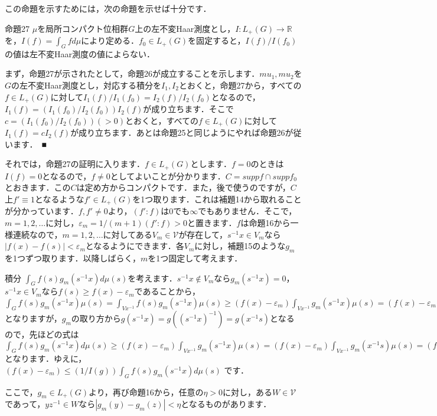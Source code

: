 この命題を示すためには，次の命題を示せば十分です．

命題27
$\mu$を局所コンパクト位相群$G$上の左不変Haar測度とし，$I \colon L_{+}(G) \to \mathbb{R}$を，$I(f)=\int_{G}f d\mu$により定める．$f_0 \in L_{+}(G)$を固定すると，$I(f)/I(f_0)$の値は左不変Haar測度の値によらない．

まず，命題27が示されたとして，命題26が成立することを示します．$mu_1, mu_2$を$G$の左不変Haar測度とし，対応する積分を$I_1, I_2$とおくと，命題27から，すべての$f \in L_{+}(G)$に対して$I_{1}(f)/I_{1}(f_0)=I_{2}(f)/I_{2}(f_0)$となるので，$I_{1}(f)= \left( I_{1}(f_0)/I_{2}(f_{0}) \right) I_{2}(f)$が成り立ちます．そこで$c=\left( I_{1}(f_0)/I_{2}(f_{0}) \right)(>0)$とおくと，すべての$f \in L_{+}(G)$に対して$I_{1}(f)= c I_{2}(f)$が成り立ちます．あとは命題25と同じようにやれば命題26が従います．　■

それでは，命題27の証明に入ります．$f \in L_{+}(G)$とします．$f=0$のときは$I(f)=0$となるので，$f \neq 0$としてよいことが分かります．$C=supp f \cap supp f_{0}$とおきます．この$C$は定め方からコンパクトです．また，後で使うのですが，$C$上$f' \equiv 1$となるような$f' \in L_{
+}(G)$を1つ取ります．これは補題14から取れることが分かっています．$f, f' \neq 0$より，$\left( f' \colon f\right)$は0でも$\infty$でもありません．そこで，$m=1,2,\ldots$に対し，$\varepsilon_{m}=1/(m+1)\left( f' \colon f \right)>0$と置きます．$f$は命題16から一様連続なので，$m=1,2,\ldots$に対してある$V_m \in \mathscr{V}$が存在して，$s^{-1}x \in V_m$なら$|f(x)-f(s)|<\varepsilon _{m}$となるようにできます．各$V_m$に対し，補題15のような$g_m$を1つずつ取ります．以降しばらく，$m$を1つ固定して考えます．

積分 $\int_{G}f(s)g_{m}(s^{-1}x)d\mu(s)$を考えます．$s^{-1}x \not\in V_m$なら$g_{m}(s^{-1}x)=0$，$s^{-1}x \in V_m$なら$f(s) \ge f(x) -\varepsilon_{m}$であることから，$\int_{G}f(s)g_{m}(s^{-1}x)\mu(s)=\int_{Vx^{-1}}f(s)g_{m}(s^{-1}x)\mu(s) \ge (f(x)-\varepsilon_{m})\int_{Vx^{-1}}g_{m}(s^{-1}x)\mu(s)=(f(x)-\varepsilon_{m})\int_{Vx^{-1}}g_{m}(s^{-1}x)\mu(s)$となりますが，$g_{m}$の取り方から$g(s^{-1}x)=g\left( (s^{-1}x)^{-1} \right)=g(x^{-1}s)$となるので，先ほどの式は$\int_{G}f(s)g_{m}(s^{-1}x)d\mu(s) \ge (f(x)-\varepsilon_{m})\int_{Vx^{-1}}g_{m}(s^{-1}x)\mu(s) = (f(x)-\varepsilon_{m})\int_{Vx^{-1}}g_{m}(x^{-1}s)\mu(s)=(f(x)-\varepsilon_{m}) I(g_{m})$ となります．ゆえに，$(f(x)-\varepsilon_{m}) \le \left( 1/I(g) \right)\int_{G}f(s)g_{m}(s^{-1}x)d\mu(s)$ です．

ここで，$g_{m} \in L_{+}(G)$より，再び命題16から，任意の$\eta >0$に対し，ある$W \in \mathscr{V}$であって，$yz^{-1} \in W$なら$|g_{m}(y)-g_{m}(z)|<\eta$となるものがあります．

